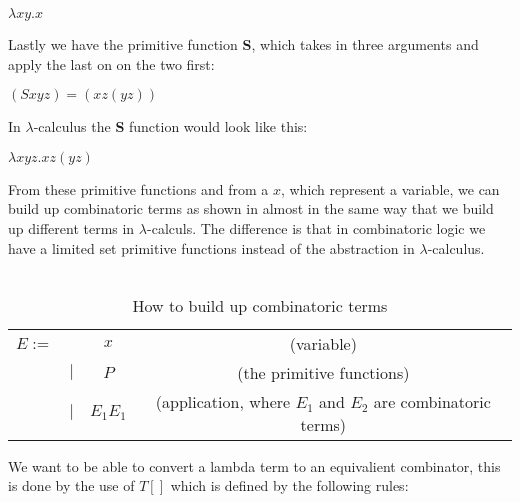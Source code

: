 \begin{center}
    $\lambda xy.x$\\    
\end{center}
Lastly we have the primitive function \textbf{S}, which takes in three arguments and apply the last on on the two first:
\begin{center}
    $ (S x y z) = (x z (y z))$\\    
\end{center}
In $\lambda$-calculus the \textbf{S} function would look like this:\\
\begin{center}
    $\lambda xyz.xz(yz)$\\    
\end{center}
From these primitive functions and from a $x$, which represent a variable,  we can build up combinatoric terms as shown in  
almost in the same way that we build up different terms in $\lambda$-calculs. The difference is that in combinatoric logic we have a limited set 
primitive functions instead of the abstraction in $\lambda$-calculus.
\\ \\
\begin{table}[]
    \centering
    \begin{tabular}{c c c | c}
         $E :=$&  & $x$ & (variable)\\
         & $|$ & $P$ & (the primitive functions) \\
         & $|$ & $E_1 E_1$ & (application, where $E_1$ and $E_2$ are combinatoric terms)\\
    \end{tabular}
    \caption{How to build up combinatoric terms}
    \label{tab:makeCombinatoricTerms}
\end{table}
We want to be able to convert a lambda term to an equivalient combinator, this is done by the use of $T[]$ which is 
defined by the following rules:

